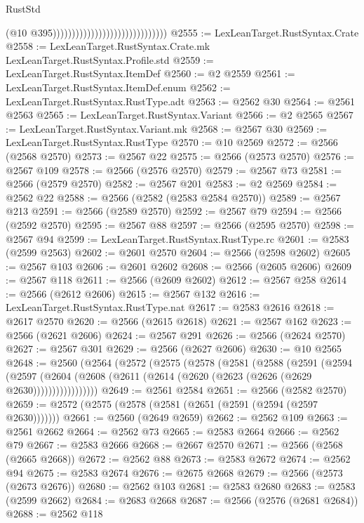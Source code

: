 \begin{lexlean}{RustStd}
\begin{coremodule}
                                                              (@10
                                                                @395))))))))))))))))))))))))))))))
@2555 := LexLeanTarget.RustSyntax.Crate
@2558 := LexLeanTarget.RustSyntax.Crate.mk LexLeanTarget.RustSyntax.Profile.std
@2559 := LexLeanTarget.RustSyntax.ItemDef
@2560 := @2 @2559
@2561 := LexLeanTarget.RustSyntax.ItemDef.enum
@2562 := LexLeanTarget.RustSyntax.RustType.adt
@2563 := @2562 @30
@2564 := @2561 @2563
@2565 := LexLeanTarget.RustSyntax.Variant
@2566 := @2 @2565
@2567 := LexLeanTarget.RustSyntax.Variant.mk
@2568 := @2567 @30
@2569 := LexLeanTarget.RustSyntax.RustType
@2570 := @10 @2569
@2572 := @2566 (@2568 @2570)
@2573 := @2567 @22
@2575 := @2566 (@2573 @2570)
@2576 := @2567 @109
@2578 := @2566 (@2576 @2570)
@2579 := @2567 @73
@2581 := @2566 (@2579 @2570)
@2582 := @2567 @201
@2583 := @2 @2569
@2584 := @2562 @22
@2588 := @2566 (@2582 (@2583 @2584 @2570))
@2589 := @2567 @213
@2591 := @2566 (@2589 @2570)
@2592 := @2567 @79
@2594 := @2566 (@2592 @2570)
@2595 := @2567 @88
@2597 := @2566 (@2595 @2570)
@2598 := @2567 @94
@2599 := LexLeanTarget.RustSyntax.RustType.rc
@2601 := @2583 (@2599 @2563)
@2602 := @2601 @2570
@2604 := @2566 (@2598 @2602)
@2605 := @2567 @103
@2606 := @2601 @2602
@2608 := @2566 (@2605 @2606)
@2609 := @2567 @118
@2611 := @2566 (@2609 @2602)
@2612 := @2567 @258
@2614 := @2566 (@2612 @2606)
@2615 := @2567 @132
@2616 := LexLeanTarget.RustSyntax.RustType.nat
@2617 := @2583 @2616
@2618 := @2617 @2570
@2620 := @2566 (@2615 @2618)
@2621 := @2567 @162
@2623 := @2566 (@2621 @2606)
@2624 := @2567 @291
@2626 := @2566 (@2624 @2570)
@2627 := @2567 @301
@2629 := @2566 (@2627 @2606)
@2630 := @10 @2565
@2648 := @2560
    (@2564
      (@2572
        (@2575
          (@2578
            (@2581
              (@2588
                (@2591
                  (@2594
                    (@2597
                      (@2604 (@2608 (@2611 (@2614 (@2620 (@2623 (@2626 (@2629 @2630)))))))))))))))))
@2649 := @2561 @2584
@2651 := @2566 (@2582 @2570)
@2659 := @2572 (@2575 (@2578 (@2581 (@2651 (@2591 (@2594 (@2597 @2630)))))))
@2661 := @2560 (@2649 @2659)
@2662 := @2562 @109
@2663 := @2561 @2662
@2664 := @2562 @73
@2665 := @2583 @2664
@2666 := @2562 @79
@2667 := @2583 @2666
@2668 := @2667 @2570
@2671 := @2566 (@2568 (@2665 @2668))
@2672 := @2562 @88
@2673 := @2583 @2672
@2674 := @2562 @94
@2675 := @2583 @2674
@2676 := @2675 @2668
@2679 := @2566 (@2573 (@2673 @2676))
@2680 := @2562 @103
@2681 := @2583 @2680
@2683 := @2583 (@2599 @2662)
@2684 := @2683 @2668
@2687 := @2566 (@2576 (@2681 @2684))
@2688 := @2562 @118

\end{coremodule}
\end{lexlean}

